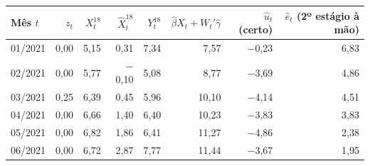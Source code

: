 \begin{tabular}{lrrrrrrr}
\toprule
Mês $t$ & $z_t$ & $X^{18}_t$ & $\widehat{X}^{18}_t$ & $Y^{18}_t$ & $\hat\beta X_t + W_t'\hat\gamma$ & $\hat u_t$ (certo) & $\hat e_t$ (2º estágio à mão) \\
\midrule
01/2021 & 0{,}00 & 5{,}15 & 0{,}31 & 7{,}34 & 7{,}57 & \ensuremath{-}0{,}23 & 6{,}83 \\
02/2021 & 0{,}00 & 5{,}77 & \ensuremath{-}0{,}10 & 5{,}08 & 8{,}77 & \ensuremath{-}3{,}69 & 4{,}86 \\
03/2021 & 0{,}25 & 6{,}39 & 0{,}45 & 5{,}96 & 10{,}10 & \ensuremath{-}4{,}14 & 4{,}51 \\
04/2021 & 0{,}00 & 6{,}66 & 1{,}40 & 6{,}40 & 10{,}23 & \ensuremath{-}3{,}83 & 3{,}83 \\
05/2021 & 0{,}00 & 6{,}82 & 1{,}86 & 6{,}41 & 11{,}27 & \ensuremath{-}4{,}86 & 2{,}38 \\
06/2021 & 0{,}00 & 6{,}72 & 2{,}87 & 7{,}77 & 11{,}44 & \ensuremath{-}3{,}67 & 1{,}95 \\
\bottomrule
\end{tabular}
